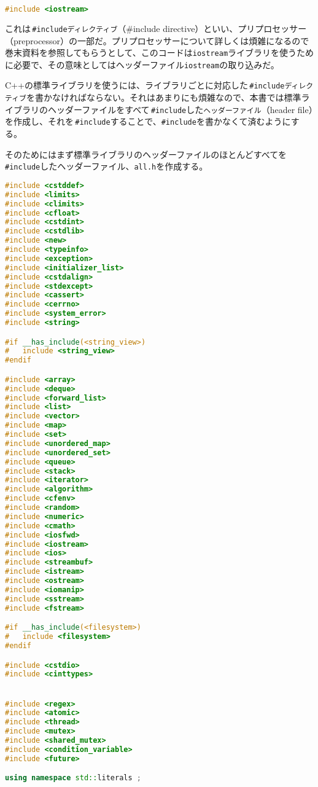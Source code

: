 \begin{lstlisting}[language={C++}]
#include <iostream>
\end{lstlisting}

これは\,\texttt{\#includeディレクティブ}（\#include directive）といい、プリプロセッサー（preprocessor）の一部だ。プリプロセッサーについて詳しくは煩雑になるので巻末資料を参照してもらうとして、このコードは\texttt{iostream}ライブラリを使うために必要で、その意味としてはヘッダーファイル\texttt{iostream}の取り込みだ。

C++の標準ライブラリを使うには、ライブラリごとに対応した\,\texttt{\#includeディレクティブ}を書かなければならない。それはあまりにも煩雑なので、本書では標準ライブラリのヘッダーファイルをすべて\,\texttt{\#include}した\texttt{ヘッダーファイル}（header file）を作成し、それを\,\texttt{\#include}することで、\texttt{\#include}を書かなくて済むようにする。

そのためにはまず標準ライブラリのヘッダーファイルのほとんどすべてを\,\texttt{\#include}したヘッダーファイル、\texttt{all.h}を作成する。

\begin{lstlisting}[language={C++}]
#include <cstddef>
#include <limits>
#include <climits>
#include <cfloat>
#include <cstdint>
#include <cstdlib>
#include <new>
#include <typeinfo>
#include <exception>
#include <initializer_list>
#include <cstdalign>
#include <stdexcept>
#include <cassert>
#include <cerrno>
#include <system_error>
#include <string>

#if __has_include(<string_view>)
#   include <string_view>
#endif

#include <array>
#include <deque>
#include <forward_list>
#include <list>
#include <vector>
#include <map>
#include <set>
#include <unordered_map>
#include <unordered_set>
#include <queue>
#include <stack>
#include <iterator>
#include <algorithm>
#include <cfenv>
#include <random>
#include <numeric>
#include <cmath>
#include <iosfwd>
#include <iostream>
#include <ios>
#include <streambuf>
#include <istream>
#include <ostream>
#include <iomanip>
#include <sstream>
#include <fstream>

#if __has_include(<filesystem>)
#   include <filesystem>
#endif

#include <cstdio>
#include <cinttypes>


#include <regex>
#include <atomic>
#include <thread>
#include <mutex>
#include <shared_mutex>
#include <condition_variable>
#include <future>

using namespace std::literals ;
\end{lstlisting}

